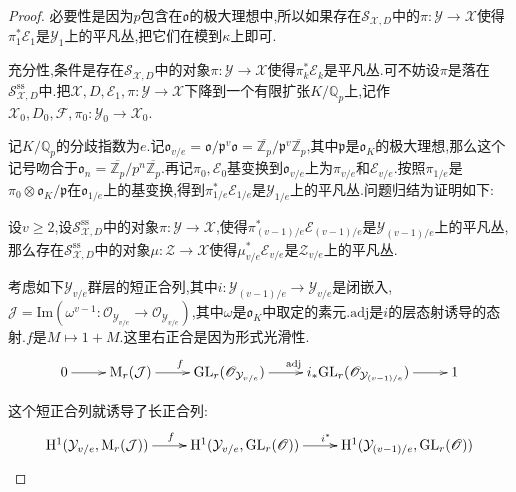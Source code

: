 \begin{enumerate}
\begin{proof}
    	必要性是因为$p$包含在$\mathfrak{o}$的极大理想中,所以如果存在$\mathcal{S}_{\mathcal{X},D}$中的$\pi:\mathcal{Y}\to\mathcal{X}$使得$\pi_1^*\mathcal{E}_1$是$\mathcal{Y}_1$上的平凡丛,把它们在模到$\kappa$上即可.
    	
    	\qquad
    	
    	充分性,条件是存在$\mathcal{S}_{\mathcal{X},D}$中的对象$\pi:\mathcal{Y}\to\mathcal{X}$使得$\pi^*_k\mathcal{E}_k$是平凡丛.可不妨设$\pi$是落在$\mathcal{S}^{\mathrm{ss}}_{\mathcal{X},D}$中.把$\mathcal{X},D,\mathcal{E}_1,\pi:\mathcal{Y}\to\mathcal{X}$下降到一个有限扩张$K/\mathbb{Q}_p$上,记作$\mathcal{X}_0,D_0,\mathcal{F},\pi_0:\mathcal{Y}_0\to\mathcal{X}_0$.
    	
    	\qquad
    	
    	记$K/\mathbb{Q}_p$的分歧指数为$e$.记$\mathfrak{o}_{v/e}=\mathfrak{o}/\mathfrak{p}^v\mathfrak{o}=\overline{\mathbb{Z}_p}/\mathfrak{p}^v\overline{\mathbb{Z}_p}$,其中$\mathfrak{p}$是$\mathfrak{o}_K$的极大理想,那么这个记号吻合于$\mathfrak{o}_n=\overline{\mathbb{Z}_p}/p^n\overline{\mathbb{Z}_p}$.再记$\pi_0,\mathcal{E}_0$基变换到$\mathfrak{o}_{v/e}$上为$\pi_{v/e}$和$\mathcal{E}_{v/e}$.按照$\pi_{1/e}$是$\pi_0\otimes\mathfrak{o}_K/\mathfrak{p}$在$\mathfrak{o}_{1/e}$上的基变换,得到$\pi^*_{1/e}\mathcal{E}_{1/e}$是$\mathcal{Y}_{1/e}$上的平凡丛.问题归结为证明如下:
    	
    	\qquad
    	
    	设$v\ge2$,设$\mathcal{S}_{\mathcal{X},D}^{\mathrm{ss}}$中的对象$\pi:\mathcal{Y}\to\mathcal{X}$,使得$\pi^*_{(v-1)/e}\mathcal{E}_{(v-1)/e}$是$\mathcal{Y}_{(v-1)/e}$上的平凡丛,那么存在$\mathcal{S}^{\mathrm{ss}}_{\mathcal{X},D}$中的对象$\mu:\mathcal{Z}\to\mathcal{X}$使得$\mu^*_{v/e}\mathcal{E}_{v/e}$是$\mathcal{Z}_{v/e}$上的平凡丛.
    	
    	\qquad
    	
    	考虑如下$\mathcal{Y}_{v/e}$群层的短正合列,其中$i:\mathcal{Y}_{(v-1)/e}\to\mathcal{Y}_{v/e}$是闭嵌入,$\mathcal{J}=\mathrm{Im}(\omega^{v-1}:\mathscr{O}_{\mathcal{Y}_{v/e}}\to\mathscr{O}_{\mathcal{Y}_{v/e}})$,其中$\omega$是$\mathfrak{o}_K$中取定的素元.$\mathrm{adj}$是$i$的层态射诱导的态射.$f$是$M\mapsto1+M$.这里右正合是因为形式光滑性.
    	$$\xymatrix{0\ar[r]&\mathrm{M}_r(\mathcal{J})\ar[r]^f&\mathrm{GL}_r(\mathscr{O}_{\mathcal{Y}_{v/e}})\ar[r]^{\mathrm{adj}}&i_*\mathrm{GL}_r(\mathscr{O}_{\mathcal{Y}_{(v-1)/e}})\ar[r]&1}$$
    	
    	\qquad
    	
    	这个短正合列就诱导了长正合列:
    	$$\xymatrix{\mathrm{H}^1(\mathcal{Y}_{v/e},\mathrm{M}_r(\mathcal{J}))\ar[r]^f&\mathrm{H}^1(\mathcal{Y}_{v/e},\mathrm{GL}_r(\mathscr{O}))\ar[r]^{i^*}&\mathrm{H}^1(\mathcal{Y}_{(v-1)/e},\mathrm{GL}_r(\mathscr{O}))}$$
    	

\end{proof}
\end{enumerate}
